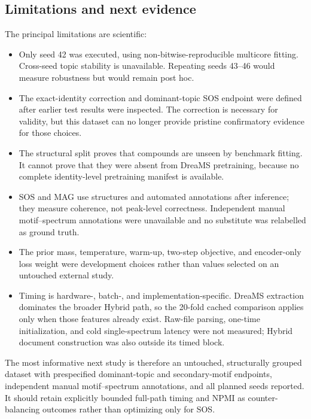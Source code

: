 \documentclass[11pt]{article}
\begin{document}
\subsection{Limitations and next evidence}

The principal limitations are scientific:
\begin{itemize}
  \item Only seed 42 was executed, using non-bitwise-reproducible multicore
        fitting. Cross-seed topic stability is unavailable. Repeating seeds
        43--46 would measure robustness but would remain post hoc.
  \item The exact-identity correction and dominant-topic SOS endpoint were
        defined after earlier test results were inspected. The correction is
        necessary for validity, but this dataset can no longer provide pristine
        confirmatory evidence for those choices.
  \item The structural split proves that compounds are unseen by benchmark
        fitting. It cannot prove that they were absent from DreaMS pretraining,
        because no complete identity-level pretraining manifest is available.
  \item SOS and MAG use structures and automated annotations after inference;
        they measure coherence, not peak-level correctness. Independent manual
        motif--spectrum annotations were unavailable and no substitute was
        relabelled as ground truth.
  \item The prior mass, temperature, warm-up, two-step objective, and
        encoder-only loss weight were development choices rather than values
        selected on an untouched external study.
  \item Timing is hardware-, batch-, and implementation-specific. DreaMS
        extraction dominates the broader Hybrid path, so the 20-fold cached
        comparison applies only when those features already exist. Raw-file
        parsing, one-time initialization, and cold single-spectrum latency were
        not measured; Hybrid document construction was also outside its timed
        block.
\end{itemize}

The most informative next study is therefore an untouched, structurally
grouped dataset with prespecified dominant-topic and secondary-motif endpoints,
independent manual motif--spectrum annotations, and all planned seeds reported.
It should retain explicitly bounded full-path timing and NPMI as
counter-balancing outcomes rather
than optimizing only for SOS.
\end{document}
